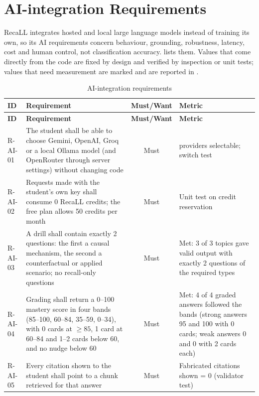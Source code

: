 \section{AI-integration Requirements}\label{sec:ai-req}

RecaLL integrates hosted and local large language models instead of training its own, so its AI
requirements concern behaviour, grounding, robustness, latency, cost and human control, not
classification accuracy.  lists them. Values that come directly from the code
are fixed by design and verified by inspection or unit tests; values that need measurement are
marked and are reported in .

\begin{small}
\begin{longtable}{@{}l >{\raggedright\arraybackslash}p{7.4cm} c >{\raggedright\arraybackslash}p{3.6cm}@{}}
\caption{AI-integration requirements}\label{tab:airec}\\
\toprule
\textbf{ID} & \textbf{Requirement} & \textbf{Must/Want} & \textbf{Metric}\\
\midrule
\endfirsthead
\toprule
\textbf{ID} & \textbf{Requirement} & \textbf{Must/Want} & \textbf{Metric}\\
\midrule
\endhead
\bottomrule
\endfoot
R-AI-01 & The student shall be able to choose Gemini, OpenAI, Groq or a local Ollama model (and
OpenRouter through server settings) without changing code & Must & 4 providers selectable;
switch test\\
R-AI-02 & Requests made with the student's own key shall consume 0 RecaLL credits; the free plan
allows 50 credits per month & Must & Unit test on credit reservation\\
R-AI-03 & A drill shall contain exactly 2 questions: the first a causal mechanism, the second a
counterfactual or applied scenario; no recall-only questions & Must & Met: 3 of 3 topics gave valid
output with exactly 2 questions of the required types\\
R-AI-04 & Grading shall return a 0--100 mastery score in four bands (85--100, 60--84, 35--59,
0--34), with 0 cards at $\geq 85$, 1 card at 60--84 and 1--2 cards below 60, and no nudge below
60 & Must & Met: 4 of 4 graded answers followed the bands (strong answers 95 and 100 with 0 cards;
weak answers 0 and 0 with 2 cards each)\\
R-AI-05 & Every citation shown to the student shall point to a chunk retrieved for that answer
& Must & Fabricated citations shown = 0 (validator test)\\

\end{longtable}
\end{small}

